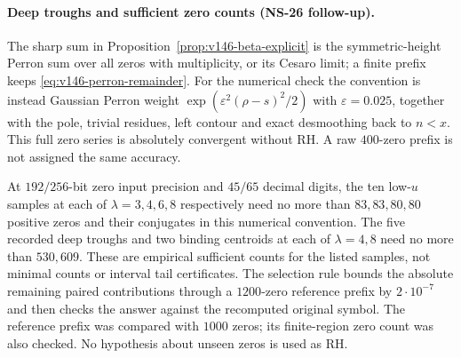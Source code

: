 \paragraph{Deep troughs and sufficient zero counts (NS-26 follow-up).}
The sharp sum in Proposition~\ref{prop:v146-beta-explicit} is the
symmetric-height Perron sum over all zeros with multiplicity, or its
Cesaro limit; a finite prefix keeps \eqref{eq:v146-perron-remainder}.
For the numerical check the convention is instead Gaussian Perron
weight $\exp(\varepsilon^2(\rho-s)^2/2)$ with
$\varepsilon=0.025$, together with the pole, trivial residues, left
contour and exact desmoothing back to $n<x$. This full zero series
is absolutely convergent without RH. A raw $400$-zero prefix is not
assigned the same accuracy.

At $192/256$-bit zero input precision and $45/65$ decimal digits, the
ten low-$u$ samples at each of $\lambda=3,4,6,8$ respectively need
no more than $83,83,80,80$ positive zeros and their conjugates in this
numerical convention. The five recorded deep troughs and two binding
centroids at each of $\lambda=4,8$ need no more than $530,609$.
These are empirical sufficient counts for the listed samples, not
minimal counts or interval tail certificates. The selection rule
bounds the absolute remaining paired contributions through a
$1200$-zero reference prefix by $2\cdot10^{-7}$ and then checks the
answer against the recomputed original symbol. The reference prefix
was compared with $1000$ zeros; its finite-region zero count was
also checked. No hypothesis about unseen zeros is used as RH.


